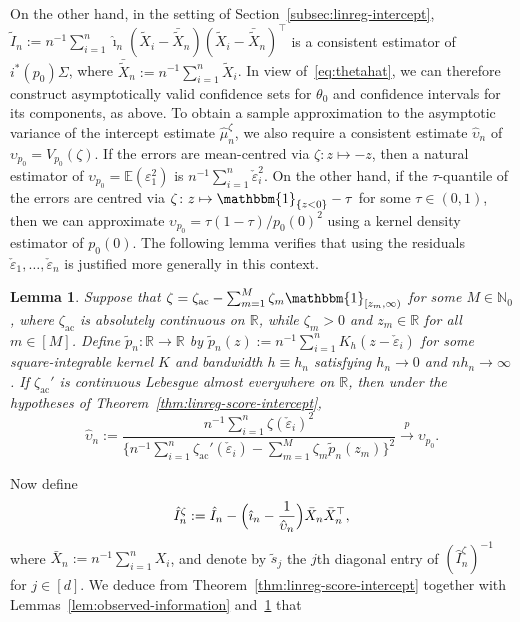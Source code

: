 \documentclass[a4paper]{article}
\newcommand{\N}{\mathbb{N}}
\newcommand{\R}{\mathbb{R}}
\newcommand{\E}{\mathbb{E}}
\newcommand{\Ind}{\mathbbm{1}}
\newcommand{\cvp}{\overset{p}{\to}}
\newtheorem{lemma}[theorem]{Lemma}
\theoremstyle{definition}
\begin{document}
On the other hand, in the setting of Section~\ref{subsec:linreg-intercept}, $\tilde{I}_n := n^{-1}\sum_{i=1}^n \hat{\imath}_n(\tilde{X}_i - \bar{\tilde{X}}_n)(\tilde{X}_i - \bar{\tilde{X}}_n)^\top$ is a consistent estimator of $i^*(p_0)\Sigma$, where $\bar{\tilde{X}}_n := n^{-1}\sum_{i=1}^n \tilde{X}_i$. In view of~\eqref{eq:thetahat}, we can therefore construct asymptotically valid confidence sets for $\theta_0$ and confidence intervals for its components, as above. To obtain a sample approximation to the asymptotic variance of the intercept estimate $\hat{\mu}_n^\zeta$, we also require a consistent estimate $\hat{\upsilon}_n$ of $\upsilon_{p_0} = V_{p_0}(\zeta)$.  If the errors are mean-centred via $\zeta \colon z \mapsto -z$, then a natural estimator of $\upsilon_{p_0} = \E(\varepsilon_1^2)$ is $n^{-1}\sum_{i=1}^n \check{\varepsilon}_i^2$. On the other hand, if the $\tau$-quantile of the errors are centred via $\zeta \colon z \mapsto \Ind_{\{z < 0\}} - \tau$ for some $\tau \in (0,1)$, then we can approximate $\upsilon_{p_0} = \tau(1 - \tau)/p_0(0)^2$ using a kernel density estimator of $p_0(0)$. The following lemma verifies that using the residuals $\check{\varepsilon}_1,\dotsc,\check{\varepsilon}_n$ is justified more generally in this context.
\begin{lemma}
\label{lem:upsilon-estimate}
Suppose that $\zeta = \zeta_{\mathrm{ac}} - \sum_{m=1}^M \zeta_m \Ind_{[z_m,\infty)}$ for some $M \in \N_0$, where $\zeta_{\mathrm{ac}}$ is absolutely continuous on $\R$, while $\zeta_m > 0$ and $z_m \in \R$ for all $m \in [M]$. Define $\tilde{p}_n \colon \R \to \R$ by $\tilde{p}_n(z) := n^{-1}\sum_{i=1}^n K_h(z - \check{\varepsilon}_i)$ for some square-integrable kernel $K$ and bandwidth $h \equiv  h_n$ satisfying $h_n \to 0$ and $nh_n \to \infty$. If $\zeta_{\mathrm{ac}}'$ is continuous Lebesgue almost everywhere on $\R$, then under the hypotheses of Theorem~\ref{thm:linreg-score-intercept},
\[
\hat{\upsilon}_n := \frac{n^{-1}\sum_{i=1}^n \zeta(\check{\varepsilon}_i)^2}{\bigl\{n^{-1}\sum_{i=1}^n \zeta_{\mathrm{ac}}'(\check{\varepsilon}_i) - \sum_{m=1}^M \zeta_m\tilde{p}_n(z_m)\bigr\}^2} \cvp \upsilon_{p_0}.
\]
\end{lemma}
Now define
\[
\hat{I}_n^\zeta := \hat{I}_n - \Bigl(\hat{\imath}_n - \frac{1}{\hat{\upsilon}_n}\Bigr)\bar{X}_n\bar{X}_n^\top,
\]
where $\bar{X}_n := n^{-1}\sum_{i=1}^n X_i$, and denote by $\tilde{s}_j$ the $j$th diagonal entry of $(\hat{I}_n^\zeta)^{-1}$ for $j \in [d]$. We deduce from Theorem~\ref{thm:linreg-score-intercept} together with Lemmas~\ref{lem:observed-information} and~\ref{lem:upsilon-estimate} that
\end{document}
